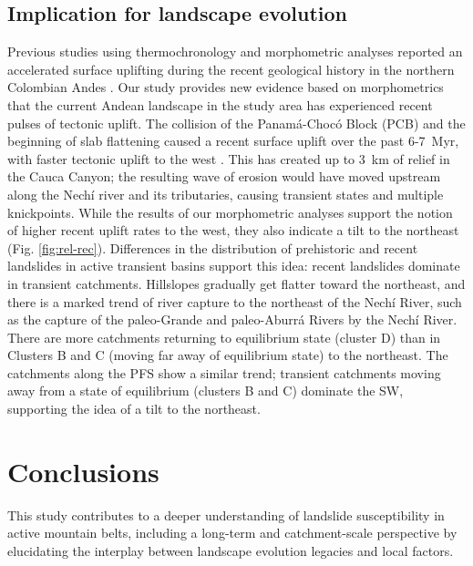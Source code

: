 \documentclass[draft]{agujournal2019}
\begin{document}
\subsection{Implication for landscape evolution}
\par Previous studies using thermochronology and morphometric analyses reported an accelerated surface uplifting during the recent geological history in the northern Colombian Andes \cite{restrepo2019, Noriega2020, perez2021, perez2022, ott2023}. Our study provides new evidence based on morphometrics that the current Andean landscape in the study area has experienced recent pulses of tectonic uplift. The collision of the Panamá-Chocó Block (PCB) and the beginning of slab flattening caused a recent surface uplift over the past 6-7~Myr, with faster tectonic uplift to the west \cite{perez2021, ott2023}. This has created up to 3~km of relief in the Cauca Canyon; the resulting wave of erosion would have moved upstream along the Nechí river and its tributaries, causing transient states and multiple knickpoints. While the results of our morphometric analyses support the notion of higher recent uplift rates to the west, they also indicate a tilt to the northeast (Fig. \ref{fig:rel-rec}). Differences in the distribution of prehistoric and recent landslides in active transient basins support this idea: recent landslides dominate in transient catchments. Hillslopes gradually get flatter toward the northeast, and there is a marked trend of river capture to the northeast of the Nechí River, such as the capture of the paleo-Grande and paleo-Aburrá Rivers by the Nechí River. There are more catchments returning to equilibrium state (cluster D) than in Clusters B and C (moving far away of equilibrium state) to the northeast. The catchments along the PFS show a similar trend; transient catchments moving away from a state of equilibrium (clusters B and C) dominate the SW, supporting the idea of a tilt to the northeast. 

\section{Conclusions}

\par This study contributes to a deeper understanding of landslide susceptibility in active mountain belts, including a long-term and catchment-scale perspective by elucidating the interplay between landscape evolution legacies and local factors. 
\end{document}
